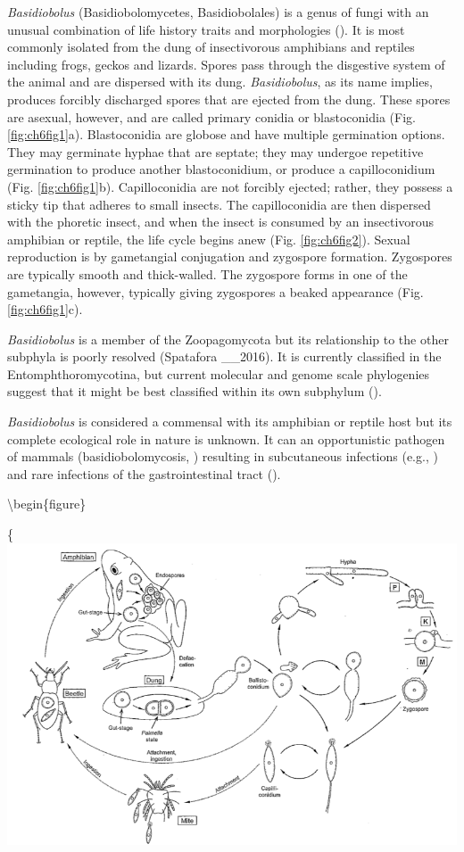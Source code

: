\documentclass[]{book}
\begin{document}
\emph{Basidiobolus} (Basidiobolomycetes, Basidiobolales) is a genus of fungi with an unusual combination of life history traits and morphologies (\citet{Humber_2012}). It is most commonly isolated from the dung of insectivorous amphibians and reptiles including frogs, geckos and lizards. Spores pass through the disgestive system of the animal and are dispersed with its dung. \emph{Basidiobolus}, as its name implies, produces forcibly discharged spores that are ejected from the dung. These spores are asexual, however, and are called primary conidia or blastoconidia (Fig. \ref{fig:ch6fig1}a). Blastoconidia are globose and have multiple germination options. They may germinate hyphae that are septate; they may undergoe repetitive germination to produce another blastoconidium, or produce a capilloconidium (Fig. \ref{fig:ch6fig1}b). Capilloconidia are not forcibly ejected; rather, they possess a sticky tip that adheres to small insects. The capilloconidia are then dispersed with the phoretic insect, and when the insect is consumed by an insectivorous amphibian or reptile, the life cycle begins anew (Fig. \ref{fig:ch6fig2}). Sexual reproduction is by gametangial conjugation and zygospore formation. Zygospores are typically smooth and thick-walled. The zygospore forms in one of the gametangia, however, typically giving zygospores a beaked appearance (Fig. \ref{fig:ch6fig1}c).

\emph{Basidiobolus} is a member of the Zoopagomycota but its relationship to the other subphyla is poorly resolved (Spatafora \_\_2016). It is currently classified in the Entomphthoromycotina, but current molecular and genome scale phylogenies suggest that it might be best classified within its own subphylum (\citet{Gryganskyi_2013}).

\emph{Basidiobolus} is considered a commensal with its amphibian or reptile host but its complete ecological role in nature is unknown. It can an opportunistic pathogen of mammals (basidiobolomycosis, \citet{Gugnani_1999}) resulting in subcutaneous infections (e.g., \citet{Anaparthy_2014}) and rare infections of the gastrointestinal tract (\citet{Geramizadeh_2015}).

\textbackslash begin\{figure\}

\{\centering \includegraphics[width=10.75in]{img/Ch6_Fig2}
\end{document}
